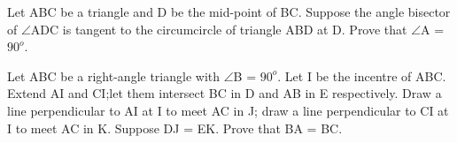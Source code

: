 \item Let ABC be a triangle and D be the mid-point of BC. Suppose the angle bisector of $\angle$ADC is tangent to the circumcircle of triangle ABD at D. Prove that $\angle$A = $90^{o}$.

\item Let ABC be a right-angle triangle with $\angle$B = $90^{o}$. Let I be the incentre of ABC. Extend AI and CI;let them intersect BC in D and AB in E respectively. Draw a line perpendicular to AI at I to meet AC in J; draw a line perpendicular to CI at I to meet AC in K. Suppose DJ = EK. Prove that BA = BC.

